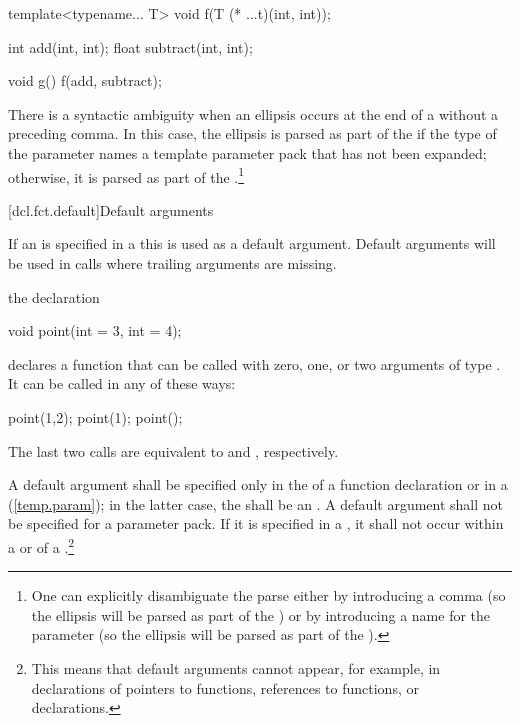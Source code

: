 \begin{codeblock}
template<typename... T> void f(T (* ...t)(int, int));

int add(int, int);
float subtract(int, int);

void g() {
  f(add, subtract);
}
\end{codeblock}
\exitexample

\pnum
There is a syntactic ambiguity when an ellipsis occurs at the end
of a  without a preceding
comma. In this case, the ellipsis is parsed as part of the
 if the type of the parameter names
a template parameter pack that has not been expanded; otherwise, it is
parsed as part of the .\footnote{One can explicitly disambiguate the parse either by
introducing a comma (so the ellipsis will be parsed as part of the
) or by introducing a name for the
parameter (so the ellipsis will be parsed as part of the
).}%

[dcl.fct.default]{Default arguments}%

\pnum
If an  is specified in a
 this
is used as a default argument.
Default arguments will be used in calls where trailing arguments are missing.

\pnum
{}%
\enterexample
the declaration

\begin{codeblock}
void point(int = 3, int = 4);
\end{codeblock}

declares a function that can be called with zero, one, or two arguments of type
.
It can be called in any of these ways:

\begin{codeblock}
point(1,2);  point(1);  point();
\end{codeblock}

The last two calls are equivalent to
and
,
respectively.
\exitexample

\pnum
A default argument shall be specified only in the
of a function declaration or in a
(\ref{temp.param});
in the latter case, the  shall be an
.
A default argument shall not be specified for a parameter pack.
If it is specified in a
,
it shall not occur within a
or
of a
.\footnote{This means that default
arguments cannot appear,
for example, in declarations of pointers to functions,
references to functions, or
declarations.
}

